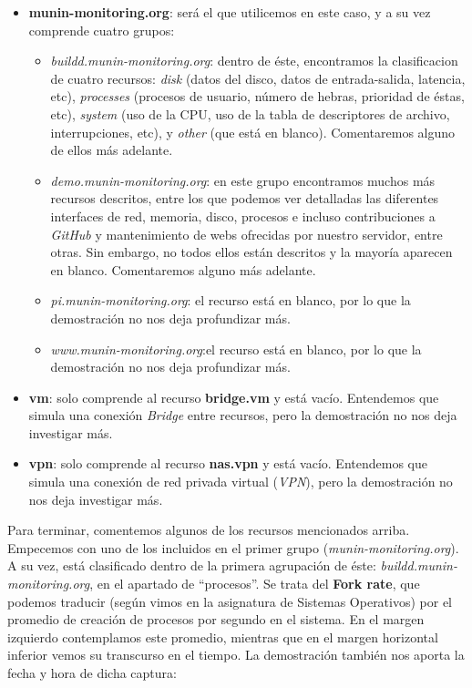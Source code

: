 \begin{itemize}
	\item \textbf{munin-monitoring.org}: será el que utilicemos en este caso, y a su vez comprende cuatro grupos:
	\begin{itemize}
		\item \emph{buildd.munin-monitoring.org}: dentro de éste, encontramos la clasificacion de cuatro recursos: \emph{disk} (datos del disco, datos de entrada-salida, latencia, etc), \emph{processes} (procesos de usuario, número de hebras, prioridad de éstas, etc), \emph{system} (uso de la CPU, uso de la tabla de descriptores de archivo, interrupciones, etc), y \emph{other} (que está en blanco). Comentaremos alguno de ellos más adelante.
		\item \emph{demo.munin-monitoring.org}: en este grupo encontramos muchos más recursos descritos, entre los que podemos ver detalladas las diferentes interfaces de red, memoria, disco, procesos e incluso contribuciones a \emph{GitHub} y mantenimiento de webs ofrecidas por nuestro servidor, entre otras. Sin embargo, no todos ellos están descritos y la mayoría aparecen en blanco. Comentaremos alguno más adelante.
		\item \emph{pi.munin-monitoring.org}: el recurso está en blanco, por lo que la demostración no nos deja profundizar más.
		\item \emph{www.munin-monitoring.org}:el recurso está en blanco, por lo que la demostración no nos deja profundizar más.
	\end{itemize}
	\item \textbf{vm}: solo comprende al recurso \textbf{bridge.vm} y está vacío. Entendemos que simula una conexión \emph{Bridge} entre recursos, pero la demostración no nos deja investigar más.
	\item \textbf{vpn}: solo comprende al recurso \textbf{nas.vpn} y está vacío. Entendemos que simula una conexión de red privada virtual (\emph{VPN}), pero la demostración no nos deja investigar más.
\end{itemize}
Para terminar, comentemos algunos de los recursos mencionados arriba. Empecemos con uno de los incluidos en el primer grupo (\emph{munin-monitoring.org}). A su vez, está clasificado dentro de la primera agrupación de éste: \emph{buildd.munin-monitoring.org}, en el apartado de ``procesos''. Se trata del \textbf{Fork rate}, que podemos traducir (según vimos en la asignatura de Sistemas Operativos) por el promedio de creación de procesos por segundo en el sistema. En el margen izquierdo contemplamos este promedio, mientras que en el margen horizontal inferior vemos su transcurso en el tiempo. La demostración también nos aporta la fecha y hora de dicha captura:
